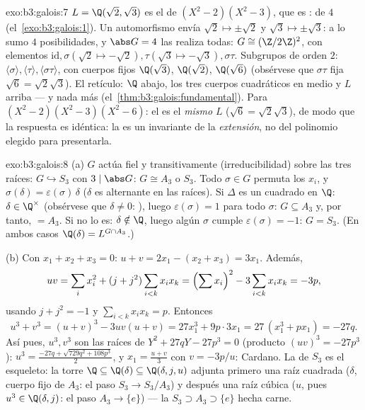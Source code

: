 \begin{solution}{exo:b3:galois:7}
$L = \Q(\sqrt2, \sqrt3)$ es el  de $(X^2 -
2)(X^2 - 3)$, que es :
 de
 $4$ (el~\cref{exo:b3:galois:1}).
Un automorfismo envía $\sqrt2 \mapsto
\pm\sqrt2$ y $\sqrt3 \mapsto \pm\sqrt3$: a lo sumo $4$ posibilidades, y
$\abs G = 4$ las realiza todas: $G \cong (\Z/2\Z)^2$, con elementos
$\mathrm{id}, \sigma (\sqrt2 \mapsto -\sqrt2), \tau
(\sqrt3\mapsto-\sqrt3), \sigma\tau$. Subgrupos de orden $2$:
$\langle\sigma\rangle, \langle\tau\rangle,
\langle\sigma\tau\rangle$, con cuerpos fijos $\Q(\sqrt3)$, $\Q(\sqrt2)$,
$\Q(\sqrt6)$ (obsérvese que $\sigma\tau$ fija $\sqrt6 =
\sqrt2\sqrt3$). El retículo: $\Q$ abajo, los tres cuerpos cuadráticos en
medio y $L$ arriba --- y nada más (el~\cref{thm:b3:galois:fundamental}).
Para $(X^2-2)(X^2-3)(X^2-6)$: el  es el \emph{mismo} $L$ ($\sqrt6 =
\sqrt2\sqrt3$), de modo que la respuesta es idéntica: la
 es un
invariante de la \emph{extensión}, no del polinomio elegido para
presentarla.
\end{solution}

\begin{solution}{exo:b3:galois:8}
(a) $G$ actúa fiel y transitivamente (irreducibilidad) sobre las tres
raíces: $G \hookrightarrow S_3$ con $3 \mid \abs G$: $G
\cong A_3$ o $S_3$. Todo $\sigma \in G$ permuta los $x_i$, y
$\sigma(\delta) = \varepsilon(\sigma)\,\delta$ ($\delta$ es alternante
en las raíces). Si $\Delta$ es un cuadrado en $\Q$:
$\delta \in \Q^\times$ (obsérvese que $\delta \neq 0$:
), luego
$\varepsilon(\sigma) = 1$ para todo $\sigma$: $G \subseteq A_3$ y, por
tanto, $= A_3$. Si no lo es: $\delta \notin \Q$, luego algún $\sigma$
cumple $\varepsilon(\sigma) = -1$: $G = S_3$. (En ambos casos
$\Q(\delta)
= L^{G \cap A_3}$.)

(b) Con $x_1 + x_2 + x_3 = 0$: $u + v = 2x_1 - (x_2 + x_3) =
3x_1$. Además,
\[
uv = \sum_i x_i^2 + (j + j^2)\sum_{i<k}x_ix_k
= \Bigl(\sum x_i\Bigr)^2 - 3\sum_{i<k}x_ix_k = -3p,
\]
usando $j + j^2 = -1$ y $\sum_{i<k}x_ix_k = p$. Entonces
\[
u^3 + v^3 = (u+v)^3 - 3uv(u+v) = 27x_1^3 + 9p\cdot 3x_1
= 27\,(x_1^3 + px_1) = -27q .
\]
Así pues, $u^3, v^3$ son las raíces de $Y^2 + 27qY - 27p^3 = 0$
(producto $(uv)^3 = -27p^3$): $u^3 = \frac{-27q +
\sqrt{729q^2 + 108p^3}}2$, y $x_1 = \frac{u + v}3$ con $v =
-3p/u$: Cardano. La  de
$S_3$ es el esqueleto: la torre
$\Q \subseteq \Q(\delta) \subseteq \Q(\delta, j, u)$ adjunta primero una
raíz cuadrada ($\delta$, cuerpo fijo de $A_3$: el paso
$S_3 \to S_3/A_3$) y después una raíz cúbica ($u$, pues $u^3
\in \Q(\delta, j)$: el paso $A_3 \to \{e\}$) --- la
$S_3 \supset A_3 \supset \{e\}$ hecha carne.
\end{solution}

